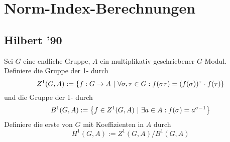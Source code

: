 \chapter{Norm-Index-Berechnungen}
\section{Hilbert '90}
Sei $G$ eine endliche Gruppe, $A$ ein multiplikativ geschriebener $G$-Modul.\\
Definiere die Gruppe der 1- durch
\[Z^1(G,A) := \{ f : G \overset{}{\rightarrow} A ~|~ \forall  \sigma, \tau \in G: f(\sigma \tau) = (f(\sigma))^\tau \cdot f(\tau) \} \]
und die Gruppe der 1- durch
\[ B^1(G,A) := \set{f \in Z^1(G,A)}{ \exists a \in A: f(\sigma) = a^{\sigma - 1} } \]
Definiere die erste  von $G$ mit Koeffizienten in $A$ durch
\[ H^1(G,A) := Z^1(G,A) / B^1(G,A) \]

